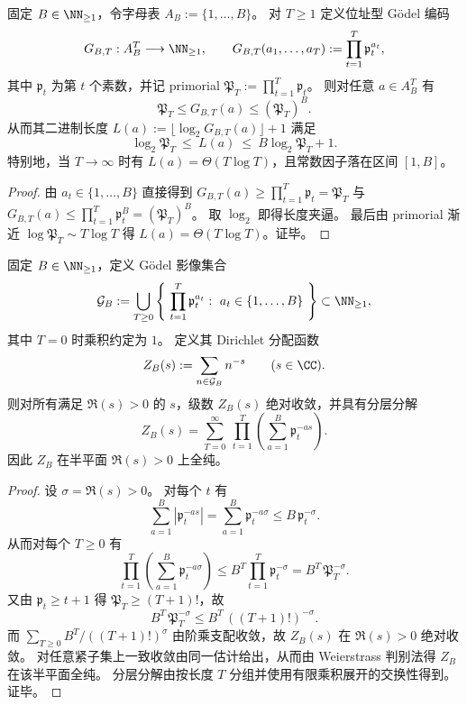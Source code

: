 \begin{corollary}\label{cor:fold-godel-finite-dictionary-bitlength-theta-TlogT}
固定 \(B\in\NN_{\ge 1}\)，令字母表 \(A_B:=\{1,\dots,B\}\)。
对 \(T\ge 1\) 定义位址型 Gödel 编码
\[
G_{B,T}:A_B^T\longrightarrow \NN_{\ge 1},
\qquad
G_{B,T}(a_1,\dots,a_T):=\prod_{t=1}^{T}\mathfrak p_t^{a_t},
\]
其中 \(\mathfrak p_t\) 为第 \(t\) 个素数，并记 primorial \(\mathfrak P_T:=\prod_{t=1}^{T}\mathfrak p_t\)。
则对任意 \(a\in A_B^T\) 有
\[
\mathfrak P_T\le G_{B,T}(a)\le (\mathfrak P_T)^B.
\]
从而其二进制长度 \(L(a):=\lfloor \log_2 G_{B,T}(a)\rfloor+1\) 满足
\[
\log_2\mathfrak P_T\ \le\ L(a)\ \le\ B\log_2\mathfrak P_T+1.
\]
特别地，当 \(T\to\infty\) 时有 \(L(a)=\Theta(T\log T)\)，且常数因子落在区间 \([1,B]\)。
\end{corollary}
\begin{proof}
由 \(a_t\in\{1,\dots,B\}\) 直接得到
\(
G_{B,T}(a)\ge \prod_{t=1}^{T}\mathfrak p_t=\mathfrak P_T
\)
与
\(
G_{B,T}(a)\le \prod_{t=1}^{T}\mathfrak p_t^{B}=(\mathfrak P_T)^B
\)。
取 \(\log_2\) 即得长度夹逼。
最后由 primorial 渐近 \(\log\mathfrak P_T\sim T\log T\) 得 \(L(a)=\Theta(T\log T)\)。证毕。
\end{proof}

\begin{theorem}\label{thm:fold-godel-finite-dictionary-dirichlet-partition-holomorphic}
固定 \(B\in\NN_{\ge 1}\)，定义 Gödel 影像集合
\[
\mathcal G_B:=\bigcup_{T\ge 0}\left\{\ \prod_{t=1}^{T}\mathfrak p_t^{a_t}:\ a_t\in\{1,\dots,B\}\ \right\}\subset \NN_{\ge 1},
\]
其中 \(T=0\) 时乘积约定为 \(1\)。
定义其 Dirichlet 分配函数
\[
Z_B(s):=\sum_{n\in\mathcal G_B} n^{-s}\qquad (s\in\CC).
\]
则对所有满足 \(\Re(s)>0\) 的 \(s\)，级数 \(Z_B(s)\) 绝对收敛，并具有分层分解
\[
Z_B(s)=\sum_{T=0}^{\infty}\ \prod_{t=1}^{T}\left(\sum_{a=1}^{B}\mathfrak p_t^{-as}\right).
\]
因此 \(Z_B\) 在半平面 \(\Re(s)>0\) 上全纯。
\end{theorem}
\begin{proof}
设 \(\sigma=\Re(s)>0\)。
对每个 \(t\) 有
\[
\sum_{a=1}^{B}\left|\mathfrak p_t^{-as}\right|
=\sum_{a=1}^{B}\mathfrak p_t^{-a\sigma}
\le B\,\mathfrak p_t^{-\sigma}.
\]
从而对每个 \(T\ge 0\) 有
\[
\prod_{t=1}^{T}\left(\sum_{a=1}^{B}\mathfrak p_t^{-a\sigma}\right)
\le
B^T\prod_{t=1}^{T}\mathfrak p_t^{-\sigma}
=
B^T\,\mathfrak P_T^{-\sigma}.
\]
又由 \(\mathfrak p_t\ge t+1\) 得 \(\mathfrak P_T\ge (T+1)!\)，故
\[
B^T\,\mathfrak P_T^{-\sigma}\le B^T\,((T+1)!)^{-\sigma}.
\]
而 \(\sum_{T\ge 0} B^T/((T+1)!)^{\sigma}\) 由阶乘支配收敛，故 \(Z_B(s)\) 在 \(\Re(s)>0\) 绝对收敛。
对任意紧子集上一致收敛由同一估计给出，从而由 Weierstrass 判别法得 \(Z_B\) 在该半平面全纯。
分层分解由按长度 \(T\) 分组并使用有限乘积展开的交换性得到。证毕。
\end{proof}

